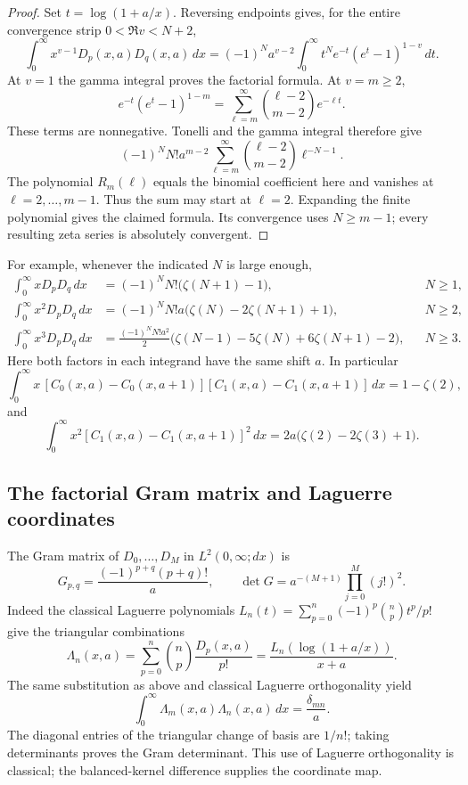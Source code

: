 \begin{proof}
Set $t=\log(1+a/x)$.  Reversing endpoints gives, for the entire convergence
strip $0<\Re v<N+2$,
\begin{equation}\label{stbil:Laplace}
 \int_0^\infty x^{v-1}D_p(x,a)D_q(x,a)\,dx
 =(-1)^N a^{v-2}\int_0^\infty
          t^Ne^{-t}(e^t-1)^{1-v}\,dt.
\end{equation}
At $v=1$ the gamma integral proves the factorial formula.  At $v=m\geq2$,
\[
 e^{-t}(e^t-1)^{1-m}
  =\sum_{\ell=m}^{\infty}\binom{\ell-2}{m-2}e^{-\ell t}.
\]
These terms are nonnegative.  Tonelli and the gamma integral therefore
give
\[
 (-1)^N N!a^{m-2}\sum_{\ell=m}^{\infty}
          \binom{\ell-2}{m-2}\ell^{-N-1}.
\]
The polynomial $R_m(\ell)$ equals the binomial coefficient here and
vanishes at $\ell=2,\ldots,m-1$.  Thus the sum may start at $\ell=2$.
Expanding the finite polynomial gives the claimed formula.  Its convergence
uses $N\geq m-1$; every resulting zeta series is absolutely convergent.
\end{proof}

For example, whenever the indicated $N$ is large enough,
\begin{align*}
 \int_0^\infty xD_pD_q\,dx
   &=(-1)^NN!\bigl(\zeta(N+1)-1\bigr), &&N\geq1,\\
 \int_0^\infty x^2D_pD_q\,dx
   &=(-1)^NN!a\bigl(\zeta(N)-2\zeta(N+1)+1\bigr), &&N\geq2,\\
 \int_0^\infty x^3D_pD_q\,dx
   &=\frac{(-1)^NN!a^2}{2}
        \bigl(\zeta(N-1)-5\zeta(N)+6\zeta(N+1)-2\bigr), &&N\geq3.
\end{align*}
Here both factors in each integrand have the same shift $a$.
In particular
\[
 \int_0^\infty x\,[C_0(x,a)-C_0(x,a+1)]
                       [C_1(x,a)-C_1(x,a+1)]\,dx=1-\zeta(2),
\]
and
\[
 \int_0^\infty x^2[C_1(x,a)-C_1(x,a+1)]^2\,dx
      =2a\bigl(\zeta(2)-2\zeta(3)+1\bigr).
\]

\subsection{The factorial Gram matrix and Laguerre coordinates}

The Gram matrix of $D_0,\ldots,D_M$ in $L^2(0,\infty;dx)$ is
\[
 G_{p,q}=\frac{(-1)^{p+q}(p+q)!}{a},\qquad
 \det G=a^{-(M+1)}\prod_{j=0}^{M}(j!)^2.
\]
Indeed the classical Laguerre polynomials
$L_n(t)=\sum_{p=0}^n(-1)^p\binom np t^p/p!$ give the triangular combinations
\[
 \Lambda_n(x,a)=\sum_{p=0}^n\binom np\frac{D_p(x,a)}{p!}
       =\frac{L_n(\log(1+a/x))}{x+a}.
\]
The same substitution as above and classical Laguerre orthogonality yield
\[
 \int_0^\infty\Lambda_m(x,a)\Lambda_n(x,a)\,dx
          =\frac{\delta_{mn}}a.
\]
The diagonal entries of the triangular change of basis are $1/n!$;
taking determinants proves the Gram determinant.  This use of Laguerre
orthogonality is classical; the balanced-kernel difference supplies the
coordinate map.

